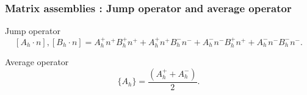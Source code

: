 \documentclass{beamer}
\begin{document}

\begin{frame}
\frametitle{Matrix assemblies : Jump operator and average operator}

\begin{block}{Jump operator}
\begin{equation} \label{Jump operator L2}
[A_h \cdot n],[B_h \cdot n] = A_h^+ n^+ B_h^+ n^+ + A_h^+ n^+ B_h^- n^- + A_h^- n^- B_h^+ n^+ + A_h^- n^- B_h^- n^- \textrm{.}
\end{equation}
\end{block}

\begin{block}{Average operator}
\begin{equation}\label{Average operator}
\lbrace A_h \rbrace = \frac{(A_h^+ + A_h^-)}{2} \textrm{.}
\end{equation}
\end{block}

\end{frame}
\end{document}

